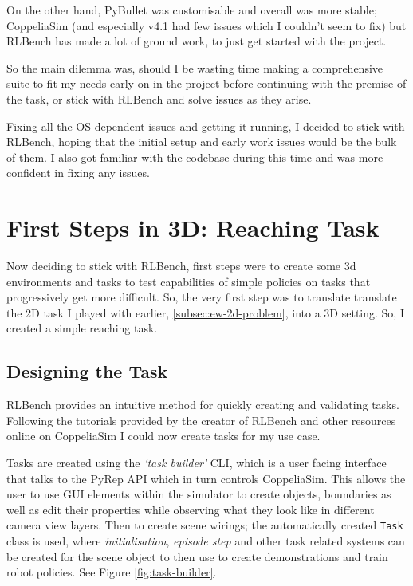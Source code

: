 On the other hand, PyBullet was customisable and overall was more stable; CoppeliaSim (and especially v4.1 had few issues which I couldn't seem to fix) but RLBench has made a lot of ground work, to just get started with the project.

So the main dilemma was, should I be wasting time making a comprehensive suite to fit my needs early on in the project before  continuing with the premise of the task, or stick with RLBench and solve issues as they arise.

Fixing all the OS dependent issues and getting it running, I decided to stick with RLBench, hoping that the initial setup and early work issues would be the bulk of them. I also got familiar with the codebase during this time and was more confident in fixing any issues.

\section{First Steps in 3D: Reaching Task}\label{sec:3d-reaching-tasks}
Now deciding to stick with RLBench, first steps were to create some 3d environments and tasks to test capabilities of simple policies on tasks that progressively get more difficult. So, the very first step was to translate translate the 2D task I played with earlier, \ref{subsec:ew-2d-problem}, into a 3D setting. So, I created a simple reaching task. 

\subsection{Designing the Task}
RLBench provides an intuitive method for quickly creating and validating tasks. Following the tutorials provided by the creator of RLBench and other resources online on CoppeliaSim  I could now create tasks for my use case.

Tasks are created using the \emph{`task builder'} CLI, which is a user facing interface that talks to the PyRep API which in turn controls CoppeliaSim. This allows the user to use GUI elements within the simulator to create objects, boundaries as well as edit their properties while observing what they look like in different camera view layers. Then to create scene wirings; the automatically created \verb|Task| class is used, where \emph{initialisation}, \emph{episode step} and other task related systems can be created for the scene object to then use to create demonstrations and train robot policies. See Figure \ref{fig:task-builder}.

